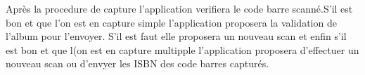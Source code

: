 Après la procedure de capture l'application verifiera le code barre scanné.S'il est bon et que l'on est en capture simple l'application proposera la validation de l'album pour l'envoyer.
S'il est faut elle proposera un nouveau scan et enfin s'il est bon et que l(on est en capture multipple l'application proposera d'effectuer un nouveau scan ou d'envyer les ISBN des code barres capturés.

\begin{figure}[htbp]
  \begin{center}
    \leavevmode
    \hspace{1cm}
    \hspace{1cm}
  \end{center}
\end{figure}

